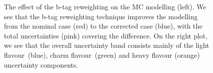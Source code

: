 \begin{figure}
\begin{centering}
\caption[B-tagging reweighting and uncertainty]{The effect of the b-tag reweighting on the MC modelling (left). We see that the b-tag reweighting technique improves the modelling from the nominal case (red) to the corrected case (blue), with the total uncertainties (pink) covering the difference. On the right plot, we see that the overall uncertainty band consists mainly of the light flavour (blue), charm flavour (green) and heavy flavour (orange) uncertainty components.}
\label{fig:tth_btag_rew}
\end{centering}
\end{figure}


